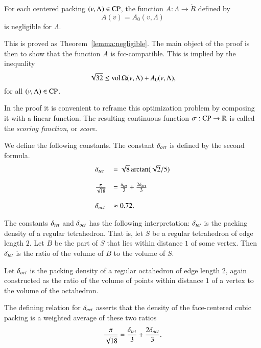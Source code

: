 \begin{theorem}\label{lemma:negligible'}
For each centered packing $(v,\Lambda)\in{\operatorname{CP}}$, the
function $A:\Lambda\to\ring{R}$ defined by
   $$A(v)= A_0(v,\Lambda)$$
is negligible for $\Lambda$.
\end{theorem}

This is proved as Theorem~\ref{lemma:negligible}.  The main object
of the proof is then to show that the function $A$ is
fcc-compatible. This is implied by the inequality
      \begin{equation}
      \sqrt{32}\le{\operatorname{vol}}\,\Omega(v,\Lambda)+ A_0(v,\Lambda),
      \label{eqn:32}
      \end{equation}
for all $(v,\Lambda)\in{\operatorname{CP}}$.

In the proof it is convenient to reframe this optimization problem
by composing it with a linear function.  The resulting continuous
function $\sigma:{\operatorname{CP}}\to\mathbb{R}$ is called the
  {\it scoring function}, or {\it score}.

\begin{definition}\label{def:dtet}  We define the following
constants.  The constant $\delta_{oct}$ is defined by the second formula.
    $$\begin{array}{lll}
      \delta_{tet} &= \sqrt{8} \arctan(\sqrt{2}/5)\\
      \\
      \frac{\pi}{\sqrt{18}} &= \frac{\delta_{tet}}{3} + \frac{2
      \delta_{oct}}{3}\\
      \\
      \delta_{oct} & \approx 0.72.
      \end{array}
    $$
\end{definition}

\begin{remark}  The constants $\delta_{tet}$ and $\delta_{oct}$ has the
following interpretation:  $\delta_{tet}$ is
the packing density of a regular tetrahedron. That is, let $S$ be
a regular tetrahedron of edge length $2$.  Let $B$ be the part of
$S$ that lies within distance $1$ of some vertex. Then $\delta_{tet}$ is
the ratio of the volume of $B$ to the volume of $S$.

Let $\delta_{oct}$ is the packing density of a
regular octahedron of edge length $2$, again constructed as the
ratio of the volume of points within distance $1$ of a vertex to
the volume of the octahedron.
\end{remark}

\begin{remark}
The defining relation for $\delta_{oct}$ asserts that the density of the
face-centered cubic packing is a weighted average of these two
ratios
    $$\frac{\pi}{\sqrt{18}} = \frac{\delta_{tet}}{3} + \frac{2 \delta_{oct}}{3}.$$
\end{remark}


